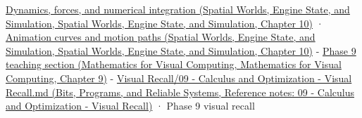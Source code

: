 \href{../05-Spatial-Worlds-Engine-State-and-Simulation/main.pdf\#nameddest=04-visual-computing-ii-ch029-dynamics-forces-and-numerical-integration}{Dynamics, forces, and numerical integration (Spatial Worlds, Engine State, and Simulation, Spatial Worlds, Engine State, and Simulation, Chapter 10)} · \href{../05-Spatial-Worlds-Engine-State-and-Simulation/main.pdf\#nameddest=04-visual-computing-ii-ch029-animation-curves-and-motion-paths}{Animation curves and motion paths (Spatial Worlds, Engine State, and Simulation, Spatial Worlds, Engine State, and Simulation, Chapter 10)} - \href{../02-Mathematics-for-Visual-Computing/main.pdf\#nameddest=02-foundations-ii-ch025-odes-and-numerical-simulation}{Phase 9 teaching section (Mathematics for Visual Computing, Mathematics for Visual Computing, Chapter 9)} - \href{../01-Bits-Programs-and-Reliable-Systems/main.pdf\#nameddest=appendix-adf48f5dc5c1}{Visual Recall/09 - Calculus and Optimization - Visual Recall.md (Bits, Programs, and Reliable Systems, Reference notes: 09 - Calculus and Optimization - Visual Recall)} · Phase 9 visual recall
